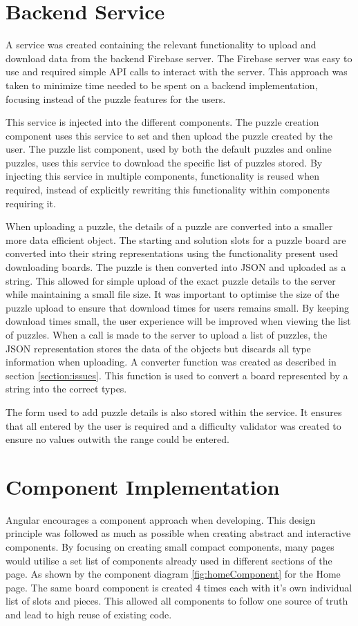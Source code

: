 \documentclass{l4proj}
\begin{document}
\section{Backend Service}
A service was created containing the relevant functionality to upload and download data from the backend Firebase server. The Firebase server was easy to use and required simple API calls to interact with the server. This approach was taken to minimize time needed to be spent on a backend implementation, focusing instead of the puzzle features for the users. 

This service is injected into the different components. The puzzle creation component uses this service to set and then upload the puzzle created by the user. The puzzle list component, used by both the default puzzles and online puzzles, uses this service to download the specific list of puzzles stored. By injecting this service in multiple components, functionality is reused when required, instead of explicitly rewriting this functionality within components requiring it.

When uploading a puzzle, the details of a puzzle are converted into a smaller more data efficient object. The starting and solution slots for a puzzle board are converted into their string representations using the functionality present used downloading boards. The puzzle is then converted into JSON and uploaded as a string. This allowed for simple upload of the exact puzzle details to the server while maintaining a small file size. It was important to optimise the size of the puzzle upload to ensure that download times for users remains small. By keeping download times small, the user experience will be improved when viewing the list of puzzles. When a call is made to the server to upload a list of puzzles, the JSON representation stores the data of the objects but discards all type information when uploading. A converter function was created as described in section \ref{section:issues}. This function is used to convert a board represented by a string into the correct types.

The form used to add puzzle details is also stored within the service. It ensures that all entered by the user is required and a difficulty validator was created to ensure no values outwith the range could be entered. 

\section{Component Implementation}
Angular encourages a component approach when developing. This design principle was followed as much as possible when creating abstract and interactive components. By focusing on creating small compact components, many pages would utilise a set list of components already used in different sections of the page. As shown by the component diagram \ref{fig:homeComponent} for the Home page. The same board component is created 4 times each with it's own individual list of slots and pieces. This allowed all components to follow one source of truth and lead to high reuse of existing code. 
\end{document}
